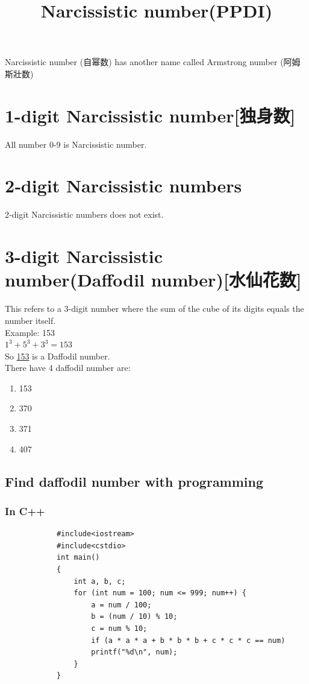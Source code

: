 \documentclass[12pt,a4paper,]{ctexart}
\title{Narcissistic number(PPDI)}
\author{}
\date{}
\begin{document}
	\maketitle
	\begin{center}
		Narcissistic number (自幂数) has another name called Armstrong number (阿姆斯壯数)
	\end{center}
	\begin{flushleft}
		\section{1-digit Narcissistic number[独身数]}
		All number 0-9 is Narcissistic number.
		\section{2‑digit Narcissistic numbers}
		2‑digit Narcissistic numbers does not exist.
		\section{3-digit Narcissistic number(Daffodil number)[水仙花数]}
		This refers to a 3-digit number where the sum of the cube of its digits equals the number itself.\\
		Example: 153\\
		$1^3+5^3+3^3 = 153$\\
		So \underline{153} is a Daffodil number.\\
		There have 4 daffodil number are:
		\begin{enumerate}
			\item 153
			\item 370
			\item 371
			\item 407
		\end{enumerate}
		\subsection{Find daffodil number with programming}
		\subsubsection{In C++}
		\begin{lstlisting}
			#include<iostream>
			#include<cstdio>
			int main()
			{
				int a, b, c;
				for (int num = 100; num <= 999; num++) {
					a = num / 100;
					b = (num / 10) % 10;
					c = num % 10;
					if (a * a * a + b * b * b + c * c * c == num)
					printf("%d\n", num);
				}
			}
		\end{lstlisting}

\end{flushleft}
\end{document}
